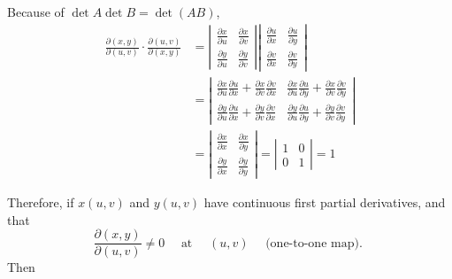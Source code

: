 \documentclass[11pt, a4paper]{MATH2023}
\begin{document}
\begin{spacing}{1.3}
    Because of $\det A \det B=\det(AB)$, 
    \begin{align*}
        \frac{\partial(x, y)}{\partial(u, v)} \cdot \frac{\partial(u, v)}{\partial(x, y)} 
        &= \left|\begin{array}{ll}\frac{\partial x}{\partial u} & \frac{\partial x}{\partial v} \\ 
            \frac{\partial y}{\partial u} & \frac{\partial y}{\partial v}\end{array} \right| 
            \left|  \begin{array}{ll}\frac{\partial u}{\partial x} & \frac{\partial u}{\partial y} \\ 
                \frac{\partial v}{\partial x} & \frac{\partial v}{\partial y}\end{array}\right|\\
        &= \left|\begin{array}{ll}\frac{\partial x}{\partial u} \frac{\partial u}{\partial x}+\frac{\partial x}{\partial v} \frac{\partial v}{\partial x} & 
            \frac{\partial x}{\partial u} \frac{\partial u}{\partial y}+\frac{\partial x}{\partial v} \frac{\partial v}{\partial y} \\ 
            \frac{\partial y}{\partial u} \frac{\partial u}{\partial x}+\frac{\partial y}{\partial v} \frac{\partial v}{\partial x} & 
            \frac{\partial y}{\partial u} \frac{\partial u}{\partial y}+\frac{\partial y}{\partial v} \frac{\partial v}{\partial y}\end{array}\right| \\ 
        &=\left|\begin{array}{ll}\frac{\partial x}{\partial x} & \frac{\partial x}{\partial y} \\ 
                \frac{\partial y}{\partial x} & \frac{\partial y}{\partial y}\end{array}\right|
        =\left|\begin{array}{cc}1 & 0 \\ 0 & 1\end{array}\right|=1
    \end{align*}

    Therefore, if $x(u,v)$ and $y(u,v)$ have continuous first partial derivatives, and that 
    $$\frac{\partial(x, y)}{\partial(u, v)} \neq 0 \quad \text { at } \quad(u, v) \quad \text { (one-to-one map). }$$
    Then
    \begin{center}
    \end{center}


\end{spacing}
\end{document}
